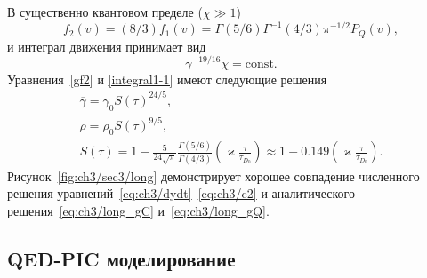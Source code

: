 В существенно квантовом пределе (${\chi\gg1}$)
\begin{equation}
    f_{2}(v)= (8/3) f_1 (v) = \Gamma(5/6) \Gamma^{-1}(4 /3) \pi^{-1/2} P_Q(v),
\end{equation} 
и интеграл движения принимает вид
\begin{equation}
    \overline{\gamma}^{-19/16}\overline{\chi} = \text{const}.\label{integral1-1}
\end{equation}
Уравнения~\eqref{gf2} и \eqref{integral1-1} имеют следующие решения
\begin{gather}
    \label{eq:ch3/long_gQ}
    \overline{\gamma} = \gamma_{0} S(\tau)^{24/5},\\
    \label{eq:ch3/long_rQ}
    \overline\rho  = \rho_{0} S(\tau)^{9/5},\\
    S(\tau) = 1-\frac{5}{24\sqrt\pi}\frac{\Gamma(5/6)}{\Gamma(4/3)}\left( \varkappa\frac{\tau}{\tau_{D_0}} \right) \approx 1 - 0.149\left( \varkappa\frac{\tau}{\tau_{D_0}} \right).
\end{gather}
Рисунок~\ref{fig:ch3/sec3/long} демонстрирует хорошее совпадение численного решения уравнений~\eqref{eq:ch3/dydt}--\eqref{eq:ch3/c2} и аналитического решения~\eqref{eq:ch3/long_gC} и~\eqref{eq:ch3/long_gQ}.

\subsection{QED-PIC моделирование}
\label{sec:ch3/sec/PIC}

